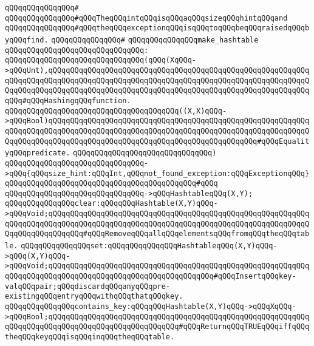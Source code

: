 \verb|qQQqqQQqqQQqqQQq#|\newline
\verb|qQQqqQQqqQQqqQQq#qQQqTheqQQqintqQQqisqQQqaqQQqsizeqQQqhintqQQqand|\newline
\verb|qQQqqQQqqQQqqQQq#qQQqtheqQQqexceptionqQQqisqQQqtoqQQqbeqQQqraisedqQQqbyqQQqfind.|\newline
\verb|qQQqqQQqqQQqqQQq#|\newline
\verb|qQQqqQQqqQQqqQQqmake_hashtable|\newline
\verb|qQQqqQQqqQQqqQQqqQQqqQQqqQQqqQQq:|\newline
\verb|qQQqqQQqqQQqqQQqqQQqqQQqqQQqqQQq(qQQq(XqQQq->qQQqUnt),qQQqqQQqqQQqqQQqqQQqqQQqqQQqqQQqqQQqqQQqqQQqqQQqqQQqqQQqqQQqqQQqqQQqqQQqqQQqqQQqqQQqqQQqqQQqqQQqqQQqqQQqqQQqqQQqqQQqqQQqqQQqqQQqqQQqqQQqqQQqqQQqqQQqqQQqqQQqqQQqqQQqqQQqqQQqqQQqqQQqqQQqqQQqqQQqqQQqqQQqqQQq#qQQqHashingqQQqfunction.|\newline
\verb|qQQqqQQqqQQqqQQqqQQqqQQqqQQqqQQqqQQqqQQq((X,X)qQQq->qQQqBool)qQQqqQQqqQQqqQQqqQQqqQQqqQQqqQQqqQQqqQQqqQQqqQQqqQQqqQQqqQQqqQQqqQQqqQQqqQQqqQQqqQQqqQQqqQQqqQQqqQQqqQQqqQQqqQQqqQQqqQQqqQQqqQQqqQQqqQQqqQQqqQQqqQQqqQQqqQQqqQQqqQQqqQQqqQQqqQQqqQQqqQQqqQQq#qQQqEqualityqQQqpredicate.|\newline
\verb|qQQqqQQqqQQqqQQqqQQqqQQqqQQqqQQq)|\newline
\verb|qQQqqQQqqQQqqQQqqQQqqQQqqQQqqQQq->qQQq{qQQqsize_hint:qQQqInt,qQQqnot_found_exception:qQQqExceptionqQQq}qQQqqQQqqQQqqQQqqQQqqQQqqQQqqQQqqQQqqQQqqQQq#qQQq|\newline
\verb|qQQqqQQqqQQqqQQqqQQqqQQqqQQqqQQq->qQQqHashtableqQQq(X,Y);|\newline
\newline
\newline
\verb|qQQqqQQqqQQqqQQqclear:qQQqqQQqHashtable(X,Y)qQQq->qQQqVoid;qQQqqQQqqQQqqQQqqQQqqQQqqQQqqQQqqQQqqQQqqQQqqQQqqQQqqQQqqQQqqQQqqQQqqQQqqQQqqQQqqQQqqQQqqQQqqQQqqQQqqQQqqQQqqQQqqQQqqQQqqQQqqQQqqQQqqQQqqQQqqQQqqQQq#qQQqRemoveqQQqallqQQqelementsqQQqfromqQQqtheqQQqtable.|\newline
\verb|qQQqqQQqqQQqqQQqset:qQQqqQQqqQQqqQQqHashtableqQQq(X,Y)qQQq->qQQq(X,Y)qQQq->qQQqVoid;qQQqqQQqqQQqqQQqqQQqqQQqqQQqqQQqqQQqqQQqqQQqqQQqqQQqqQQqqQQqqQQqqQQqqQQqqQQqqQQqqQQqqQQqqQQqqQQqqQQqqQQqqQQq#qQQqInsertqQQqkey-valqQQqpair;qQQqdiscardqQQqanyqQQqpre-existingqQQqentryqQQqwithqQQqthatqQQqkey.|\newline
\newline
\verb|qQQqqQQqqQQqqQQqcontains_key:qQQqqQQqHashtable(X,Y)qQQq->qQQqXqQQq->qQQqBool;qQQqqQQqqQQqqQQqqQQqqQQqqQQqqQQqqQQqqQQqqQQqqQQqqQQqqQQqqQQqqQQqqQQqqQQqqQQqqQQqqQQqqQQqqQQqqQQqqQQq#qQQqReturnqQQqTRUEqQQqiffqQQqtheqQQqkeyqQQqisqQQqinqQQqtheqQQqtable.|\newline
